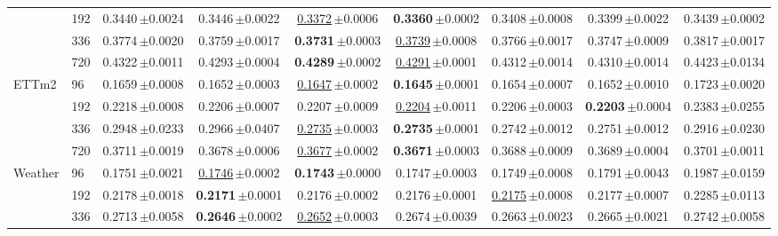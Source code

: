 \begin{tabular}{llccccccc}
 & 192 & 0.3440\,{\tiny$\pm$0.0024} & 0.3446\,{\tiny$\pm$0.0022} & \underline{0.3372}\,{\tiny$\pm$0.0006} & \textbf{0.3360}\,{\tiny$\pm$0.0002} & 0.3408\,{\tiny$\pm$0.0008} & 0.3399\,{\tiny$\pm$0.0022} & 0.3439\,{\tiny$\pm$0.0002} \\
 & 336 & 0.3774\,{\tiny$\pm$0.0020} & 0.3759\,{\tiny$\pm$0.0017} & \textbf{0.3731}\,{\tiny$\pm$0.0003} & \underline{0.3739}\,{\tiny$\pm$0.0008} & 0.3766\,{\tiny$\pm$0.0017} & 0.3747\,{\tiny$\pm$0.0009} & 0.3817\,{\tiny$\pm$0.0017} \\
 & 720 & 0.4322\,{\tiny$\pm$0.0011} & 0.4293\,{\tiny$\pm$0.0004} & \textbf{0.4289}\,{\tiny$\pm$0.0002} & \underline{0.4291}\,{\tiny$\pm$0.0001} & 0.4312\,{\tiny$\pm$0.0014} & 0.4310\,{\tiny$\pm$0.0014} & 0.4423\,{\tiny$\pm$0.0134} \\
\midrule
\multirow{4}{*}{ETTm2} & 96 & 0.1659\,{\tiny$\pm$0.0008} & 0.1652\,{\tiny$\pm$0.0003} & \underline{0.1647}\,{\tiny$\pm$0.0002} & \textbf{0.1645}\,{\tiny$\pm$0.0001} & 0.1654\,{\tiny$\pm$0.0007} & 0.1652\,{\tiny$\pm$0.0010} & 0.1723\,{\tiny$\pm$0.0020} \\
 & 192 & 0.2218\,{\tiny$\pm$0.0008} & 0.2206\,{\tiny$\pm$0.0007} & 0.2207\,{\tiny$\pm$0.0009} & \underline{0.2204}\,{\tiny$\pm$0.0011} & 0.2206\,{\tiny$\pm$0.0003} & \textbf{0.2203}\,{\tiny$\pm$0.0004} & 0.2383\,{\tiny$\pm$0.0255} \\
 & 336 & 0.2948\,{\tiny$\pm$0.0233} & 0.2966\,{\tiny$\pm$0.0407} & \underline{0.2735}\,{\tiny$\pm$0.0003} & \textbf{0.2735}\,{\tiny$\pm$0.0001} & 0.2742\,{\tiny$\pm$0.0012} & 0.2751\,{\tiny$\pm$0.0012} & 0.2916\,{\tiny$\pm$0.0230} \\
 & 720 & 0.3711\,{\tiny$\pm$0.0019} & 0.3678\,{\tiny$\pm$0.0006} & \underline{0.3677}\,{\tiny$\pm$0.0002} & \textbf{0.3671}\,{\tiny$\pm$0.0003} & 0.3688\,{\tiny$\pm$0.0009} & 0.3689\,{\tiny$\pm$0.0004} & 0.3701\,{\tiny$\pm$0.0011} \\
\midrule
\multirow{4}{*}{Weather} & 96 & 0.1751\,{\tiny$\pm$0.0021} & \underline{0.1746}\,{\tiny$\pm$0.0002} & \textbf{0.1743}\,{\tiny$\pm$0.0000} & 0.1747\,{\tiny$\pm$0.0003} & 0.1749\,{\tiny$\pm$0.0008} & 0.1791\,{\tiny$\pm$0.0043} & 0.1987\,{\tiny$\pm$0.0159} \\
 & 192 & 0.2178\,{\tiny$\pm$0.0018} & \textbf{0.2171}\,{\tiny$\pm$0.0001} & 0.2176\,{\tiny$\pm$0.0002} & 0.2176\,{\tiny$\pm$0.0001} & \underline{0.2175}\,{\tiny$\pm$0.0008} & 0.2177\,{\tiny$\pm$0.0007} & 0.2285\,{\tiny$\pm$0.0113} \\
 & 336 & 0.2713\,{\tiny$\pm$0.0058} & \textbf{0.2646}\,{\tiny$\pm$0.0002} & \underline{0.2652}\,{\tiny$\pm$0.0003} & 0.2674\,{\tiny$\pm$0.0039} & 0.2663\,{\tiny$\pm$0.0023} & 0.2665\,{\tiny$\pm$0.0021} & 0.2742\,{\tiny$\pm$0.0058} \\

\end{tabular}
